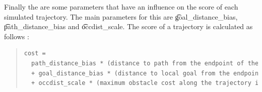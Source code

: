 Finally the are some parameters that have an influence on the score of each simulated trajectory. The main parameters for this are \t{goal_distance_bias}, \t{path_distance_bias} and \t{occdist_scale}. The score of a trajectory is calculated as follows \cite{ROSorg}:

\begin{quote}
\begin{lstlisting}[language = XML]
	cost =
  path_distance_bias * (distance to path from the endpoint of the trajectory in meters)
  + goal_distance_bias * (distance to local goal from the endpoint of the trajectory in meters)
  + occdist_scale * (maximum obstacle cost along the trajectory in obstacle cost (0-254))roslaunch navigation exercise5.launch
\end{lstlisting}
\end{quote}

